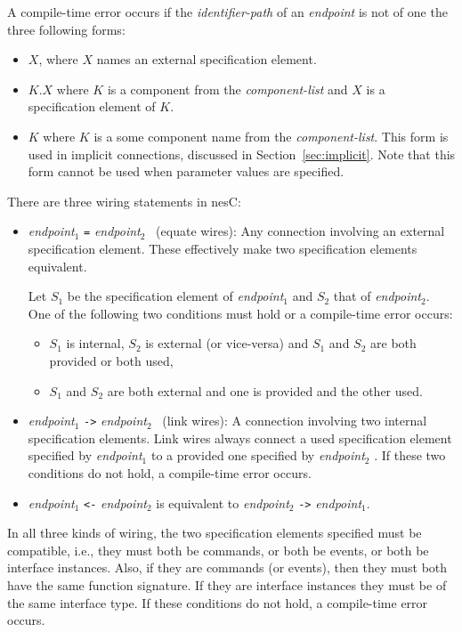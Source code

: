\documentclass[11pt]{article}
\newcommand{\code}[1]{{\tt #1}}
\newcommand{\nesc}{nesC\xspace}
\begin{document}
A compile-time error occurs if the \emph{identifier-path} of an
\emph{endpoint} is not of one the three following forms:
\begin{itemize}
\item $X$, where $X$ names an external specification element.
\item $K.X$ where $K$ is a component from the \emph{component-list} and
$X$ is a specification element of $K$.
\item $K$ where $K$ is a some component name from the \emph{component-list}.
This form is used in implicit connections, discussed in
Section~\ref{sec:implicit}. Note that this form cannot be used when
parameter values are specified.
\end{itemize}

There are three wiring statements in \nesc:
\begin{itemize}
\item \emph{endpoint}$_1$ \code{=} \emph{endpoint}$_2$ \ (equate wires):
Any connection involving an external specification element. These
effectively make two specification elements equivalent.

Let $S_1$ be the specification element of \emph{endpoint}$_1$ and $S_2$
that of \emph{endpoint}$_2$. One of the following two conditions must hold
or a compile-time error occurs:
\begin{itemize}
\item $S_1$ is internal, $S_2$ is external (or vice-versa) and $S_1$ and
$S_2$ are both provided or both used,
\item $S_1$ and $S_2$ are both external and one is provided and the other used.
\end{itemize}

\item \emph{endpoint}$_1$ \code{->} \emph{endpoint}$_2$ \ (link wires): A
connection involving two internal specification elements. Link wires always
connect a used specification element specified by \emph{endpoint}$_1$ to a
provided one specified by \emph{endpoint}$_2$ . If these two conditions do
not hold, a compile-time error occurs.

\item \emph{endpoint}$_1$ \code{<-} \emph{endpoint}$_2$ is equivalent to
\emph{endpoint}$_2$ \code{->} \emph{endpoint}$_1$.
\end{itemize}

In all three kinds of wiring, the two specification elements specified must
be compatible, i.e., they must both be commands, or both be events, or both
be interface instances. Also, if they are commands (or events), then they
must both have the same function signature. If they are interface instances
they must be of the same interface type. If these conditions do not hold,
a compile-time error occurs.
\end{document}
